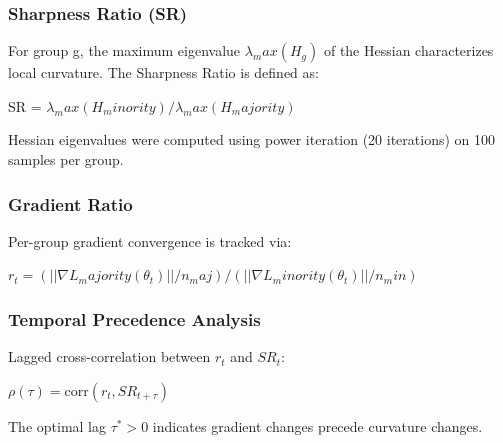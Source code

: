 
\subsubsection{Sharpness Ratio (SR)}

For group g, the maximum eigenvalue $\lambda _max(H_{g})$ of the Hessian characterizes local curvature. The Sharpness Ratio is defined as:

SR = $\lambda _max(H_minority) / \lambda _max(H_majority)$

Hessian eigenvalues were computed using power iteration (20 iterations) on 100 samples per group.

\subsubsection{Gradient Ratio}

Per-group gradient convergence is tracked via:

$r_t = (||\nabla L_majority(\theta _{t})|| / n_maj) / (||\nabla L_minority(\theta _{t})|| / n_min)$

\subsubsection{Temporal Precedence Analysis}

Lagged cross-correlation between $r_t$ and $SR_t$:

$\rho(\tau) = \text{corr}(r_t, SR_{t+\tau})$

The optimal lag $\tau^* > 0$ indicates gradient changes precede curvature changes.

